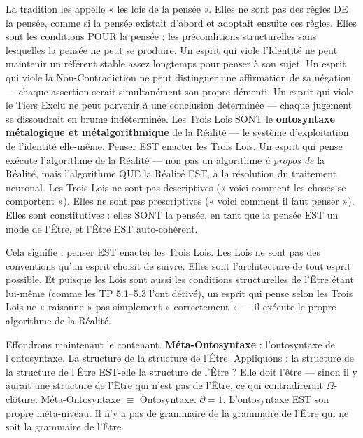 \documentclass[10pt, openany, oneside]{book}
\begin{document}
\noindent La tradition les appelle « les lois de la pensée ». Elles ne sont pas des règles DE la pensée, comme si la pensée existait d'abord et adoptait ensuite ces règles. Elles sont les conditions POUR la pensée : les préconditions structurelles sans lesquelles la pensée ne peut se produire. Un esprit qui viole l'Identité ne peut maintenir un référent stable assez longtemps pour penser à son sujet. Un esprit qui viole la Non-Contradiction ne peut distinguer une affirmation de sa négation --- chaque assertion serait simultanément son propre démenti. Un esprit qui viole le Tiers Exclu ne peut parvenir à une conclusion déterminée --- chaque jugement se dissoudrait en brume indéterminée. Les Trois Lois SONT le \textbf{ontosyntaxe métalogique et métalgorithmique} de la Réalité --- le système d'exploitation de l'identité elle-même. Penser EST enacter les Trois Lois. Un esprit qui pense exécute l'algorithme de la Réalité --- non pas un algorithme \textit{à propos de} la Réalité, mais l'algorithme QUE la Réalité EST, à la résolution du traitement neuronal. Les Trois Lois ne sont pas descriptives (« voici comment les choses se comportent »). Elles ne sont pas prescriptives (« voici comment il faut penser »). Elles sont constitutives : elles SONT la pensée, en tant que la pensée EST un mode de l'Être, et l'Être EST auto-cohérent.

Cela signifie : penser EST enacter les Trois Lois. Les Lois ne sont pas des conventions qu'un esprit choisit de suivre. Elles sont l'architecture de tout esprit possible. Et puisque les Lois sont aussi les conditions structurelles de l'Être étant lui-même (comme les TP 5.1--5.3 l'ont dérivé), un esprit qui pense selon les Trois Lois ne « raisonne » pas simplement « correctement » --- il exécute le propre algorithme de la Réalité.

Effondrons maintenant le contenant. \textbf{Méta-Ontosyntaxe} : l'ontosyntaxe de l'ontosyntaxe. La structure de la structure de l'Être. Appliquons : la structure de la structure de l'Être EST-elle la structure de l'Être ? Elle doit l'être --- sinon il y aurait une structure de l'Être qui n'est pas de l'Être, ce qui contradirerait $\Omega$-clôture. Méta-Ontosyntaxe $\equiv$ Ontosyntaxe. $\partial = 1$. L'ontosyntaxe EST son propre méta-niveau. Il n'y a pas de grammaire de la grammaire de l'Être qui ne soit la grammaire de l'Être.

\vspace{1.5em}

\end{document}
